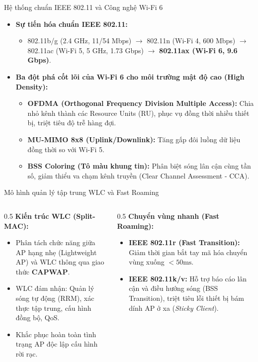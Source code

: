\documentclass[fleqn]{beamer}
\begin{document}
\begin{frame}{Hệ thống chuẩn IEEE 802.11 và Công nghệ Wi-Fi 6}
  \begin{itemize}\small
    \item \textbf{Sự tiến hóa chuẩn IEEE 802.11:}
      \begin{itemize}\footnotesize
        \item 802.11b/g (2.4 GHz, 11/54 Mbps) $\rightarrow$ 802.11n (Wi-Fi 4, 600 Mbps) $\rightarrow$ 802.11ac (Wi-Fi 5, 5 GHz, 1.73 Gbps) $\rightarrow$ \textbf{802.11ax (Wi-Fi 6, 9.6 Gbps)}.
      \end{itemize}
    \item \textbf{Ba đột phá cốt lõi của Wi-Fi 6 cho môi trường mật độ cao (High Density):}
      \begin{itemize}\footnotesize
        \item \textbf{OFDMA (Orthogonal Frequency Division Multiple Access):} Chia nhỏ kênh thành các Resource Units (RU), phục vụ đồng thời nhiều thiết bị, triệt tiêu độ trễ hàng đợi.
        \item \textbf{MU-MIMO 8x8 (Uplink/Downlink):} Tăng gấp đôi luồng dữ liệu đồng thời so với Wi-Fi 5.
        \item \textbf{BSS Coloring (Tô màu khung tin):} Phân biệt sóng lân cận cùng tần số, giảm thiểu va chạm kênh truyền (Clear Channel Assessment - CCA).
      \end{itemize}
  \end{itemize}
\end{frame}

\begin{frame}{Mô hình quản lý tập trung WLC và Fast Roaming}
  \begin{columns}
    \begin{column}{0.5\textwidth}
      \textbf{Kiến trúc WLC (Split-MAC):}
      \begin{itemize}\small
        \item Phân tách chức năng giữa AP hạng nhẹ (Lightweight AP) và WLC thông qua giao thức \textbf{CAPWAP}.
        \item WLC đảm nhận: Quản lý sóng tự động (RRM), xác thực tập trung, cấu hình đồng bộ, QoS.
        \item Khắc phục hoàn toàn tình trạng AP độc lập cấu hình rời rạc.
      \end{itemize}
    \end{column}
    \begin{column}{0.5\textwidth}
      \textbf{Chuyển vùng nhanh (Fast Roaming):}
      \begin{itemize}\small
        \item \textbf{IEEE 802.11r (Fast Transition):} Giảm thời gian bắt tay mã hóa chuyển vùng xuống $< 50\text{ms}$.
        \item \textbf{IEEE 802.11k/v:} Hỗ trợ báo cáo lân cận và điều hướng sóng (BSS Transition), triệt tiêu lỗi thiết bị bám dính AP ở xa (\textit{Sticky Client}).
      \end{itemize}
    \end{column}
  \end{columns}
\end{frame}
\end{document}
